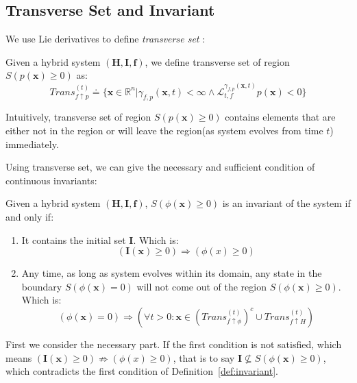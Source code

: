 \documentclass{jssc}
\begin{document}
\subsection{Transverse Set and Invariant}
We use Lie derivatives to define \emph{transverse set} :

\begin{definition}
\label{def:trans}
	Given a hybrid system $(\boldsymbol{H}, \boldsymbol{I}, \boldsymbol{f})$, we define transverse set of region $S(p(\boldsymbol{x}) \geq 0)$ as:
	\begin{equation*}
		Trans_{f \uparrow p}^{(t)} \doteq \{\boldsymbol{x} \in \mathbb{R}^n | \gamma_{f, p}(\boldsymbol{x}, t) < \infty \wedge \mathcal{L}_{t, f}^{\gamma_{f, p}(\boldsymbol{x}, t)} p(\boldsymbol{x}) < 0 \}
	\end{equation*}
\end{definition}

Intuitively, transverse set of region $S(p(\boldsymbol{x}) \geq 0)$ contains elements that are either not in the region or will leave the region(as system evolves from time $t$) immediately.

Using transverse set, we can give the necessary and sufficient condition of continuous invariants:

\begin{theorem}
\label{thm:trans}
Given a hybrid system $(\boldsymbol{H}, \boldsymbol{I}, \boldsymbol{f})$, $S(\phi(\boldsymbol{x}) \geq 0)$ is an invariant of the system if and only if:
	\begin{enumerate}
		\item It contains the initial set $\boldsymbol{I}$. Which is:
			\begin{equation*}
				(\boldsymbol{I}(\boldsymbol{x}) \geq 0) \Rightarrow (\phi(x) \geq 0)
			\end{equation*}
		\item Any time, as long as system evolves within its domain, any state in the boundary $S(\phi(\boldsymbol{x}) = 0)$ will not come out of the region $S(\phi(\boldsymbol{x}) \geq 0)$. Which is:
			\begin{equation*}
				(\phi(\boldsymbol{x}) = 0) \Rightarrow (\forall t>0: \boldsymbol{x} \in (Trans_{f \uparrow \phi}^{(t)})^c \cup Trans_{f \uparrow H}^{(t)})
			\end{equation*}
	\end{enumerate}
\end{theorem}

\proof
First we consider the necessary part. If the first condition is not satisfied, which means $(\boldsymbol{I}(\boldsymbol{x}) \geq 0) \nRightarrow (\phi(x) \geq 0)$, that is to say $\boldsymbol{I} \not\subseteq S(\phi(\boldsymbol{x}) \geq 0)$, which contradicts the first condition of Definition~\ref{def:invariant}.
\end{document}
